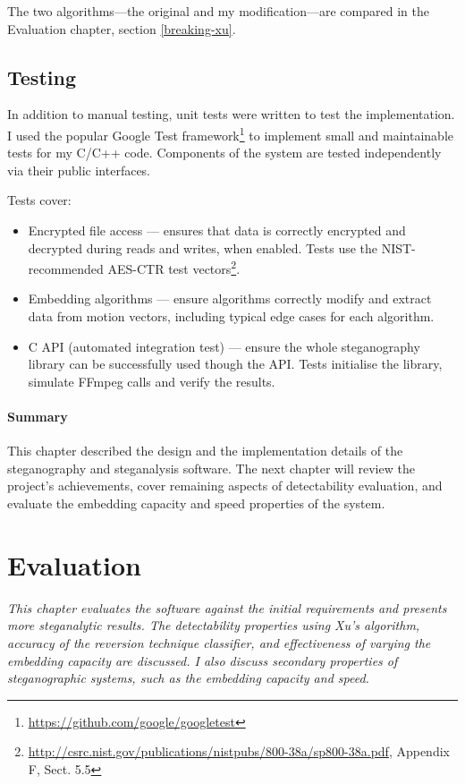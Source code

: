 \documentclass[12pt,british,twoside,notitlepage,usenames,dvipsnames,hypens,final]{report}
\numberwithin{equation}{section}
\numberwithin{figure}{section}
\begin{document}
The two algorithms---the original and my modification---are compared in the Evaluation chapter, section \ref{breaking-xu}.

\section{Testing}

In addition to manual testing, unit tests were written to test the implementation. I used the popular Google Test framework\footnote{\url{https://github.com/google/googletest}} to implement small and maintainable tests for my C/C++ code. Components of the system are tested independently via their public interfaces.

Tests cover:
\begin{itemize}
\item Encrypted file access --- ensures that data is correctly encrypted and decrypted during reads and writes, when enabled. Tests use the NIST-recommended AES-CTR test vectors\footnote{\url{http://csrc.nist.gov/publications/nistpubs/800-38a/sp800-38a.pdf}, Appendix F, Sect. 5.5}.
\item Embedding algorithms --- ensure algorithms correctly modify and extract data from motion vectors, including typical edge cases for each algorithm.
\item C API (automated integration test) --- ensure the whole steganography library can be successfully used though the API. Tests initialise the library, simulate FFmpeg calls and verify the results.
\end{itemize}

\bigskip
\subsubsection*{Summary}
This chapter described the design and the implementation details of the steganography and steganalysis software. The next chapter will review the project's achievements, cover remaining aspects of detectability evaluation, and evaluate the embedding capacity and speed properties of the system.

\cleardoublepage
\chapter{Evaluation}

\textit{This chapter evaluates the software against the initial requirements and presents more steganalytic results. The detectability properties using Xu's algorithm, accuracy of the reversion technique classifier, and effectiveness of varying the embedding capacity are discussed. I also discuss secondary properties of steganographic systems, such as the embedding capacity and speed.
}
\end{document}
